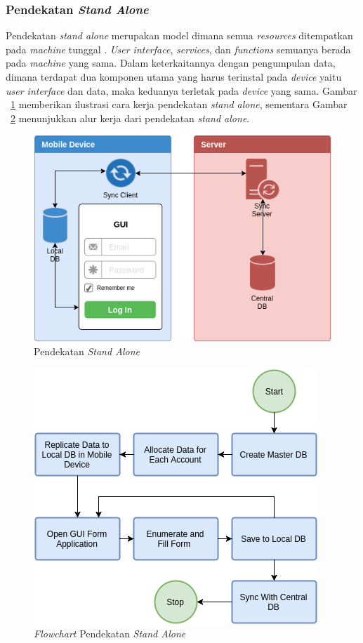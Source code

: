\subsubsection{Pendekatan \textit{Stand Alone}} \label{sssec:stand-alone}

Pendekatan \textit{stand alone} merupakan model dimana semua \textit{resources} ditempatkan pada \textit{machine} tunggal \cite{li_collaborative_2005}. \textit{User interface}, \textit{services}, dan \textit{functions} semuanya berada pada \textit{machine} yang sama. Dalam keterkaitannya dengan pengumpulan data, dimana terdapat dua komponen utama yang harus terinstal pada \textit{device} yaitu \textit{user interface} dan data, maka keduanya terletak pada \textit{device} yang sama. Gambar ~\ref{fig:design-stand-alone} memberikan ilustrasi cara kerja pendekatan \textit{stand alone}, sementara Gambar ~\ref{fig:design-stand-alone-flowchart} menunjukkan alur kerja dari pendekatan \textit{stand alone}.


\begin{figure}[h]
    \centering
    \includegraphics[width=.7\textwidth]{../../Resources/Images/design-stand-alone}
    \caption{Pendekatan \textit{Stand Alone}}
    \label{fig:design-stand-alone}
\end{figure}

\begin{figure}[h]
    \centering
    \includegraphics[width=.7\textwidth]{../../Resources/Images/design-stand-alone-flowchart}
    \caption{\textit{Flowchart} Pendekatan \textit{Stand Alone}}
    \label{fig:design-stand-alone-flowchart}
\end{figure}


